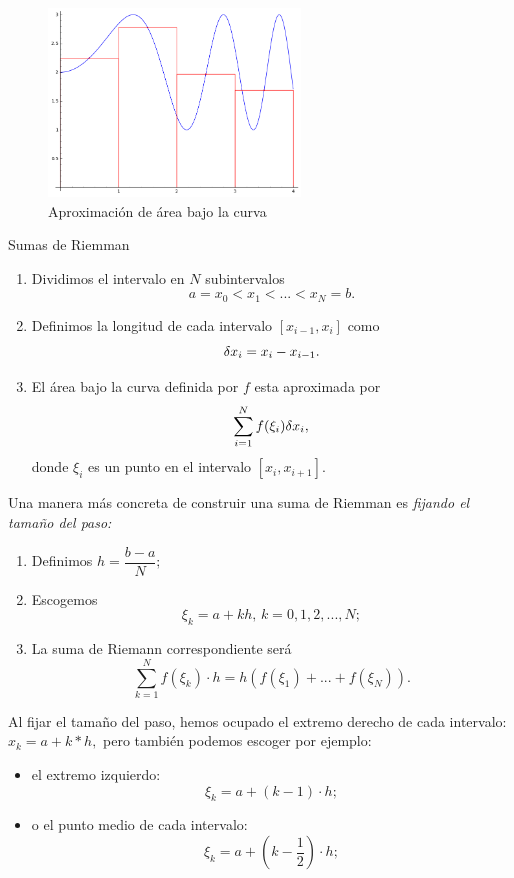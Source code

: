 	\begin{figure}
		\centering
		\includegraphics[height=5cm,keepaspectratio=true]{./calculo/tmp_h5b5ua.png}
		\caption{Aproximación de área bajo la curva}
		\label{fig:ayr:23.2}
	\end{figure}




	\begin{algoritmo}{Sumas de Riemman}
		\label{suma:riemann}
		\begin{enumerate}
			\item Dividimos el intervalo en $N$ subintervalos
			$$a=x_{0}<x_{1}<...<x_{N}=b.$$

			\item Definimos la longitud de cada intervalo $[x_{i-1},x_{i}]$ como $$\delta x_{i}=x_{i}-x_{i-1}.$$

			\item El área bajo la curva definida por $f$ esta aproximada por
			$$\sum_{i=1}^{N} f(\xi_{i})\delta x_{i},$$
			donde $\xi_{i}$ es un punto en el intervalo $[x_{i},x_{i+1}].$
		\end{enumerate}
	\end{algoritmo}



	Una manera más concreta de construir una suma de Riemman es \emph{fijando el tamaño del paso:}
	\begin{enumerate}
		\item Definimos $h=\dfrac{b-a}{N};$
		\item Escogemos $$\xi_{k}=a+kh, \, k=0,1,2,...,N;$$
		\item La suma de Riemann correspondiente será
		$$
		\sum_{k=1}^{N}f(\xi_{k})\cdot h=h\left( f(\xi_{1})+...+f(\xi_{N}) \right).
		$$
	\end{enumerate}




	Al fijar el tamaño del paso, hemos ocupado el extremo derecho de cada intervalo: $x_{k}=a+k*h,$ pero también podemos escoger por ejemplo:
	\begin{itemize}
		\item el extremo izquierdo:
		$$\xi_{k}=a+(k-1)\cdot h;$$
		\item o el punto medio de cada intervalo:
		$$\xi_{k}=a+\left( k-\dfrac{1}{2} \right) \cdot h;$$
	\end{itemize}





